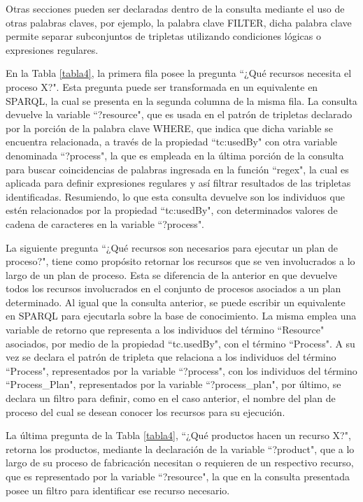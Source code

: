 \documentclass[journal]{IEEEtran}
\begin{document}
Otras secciones pueden ser declaradas dentro de la consulta mediante el uso de otras palabras claves, por ejemplo, la palabra clave FILTER, dicha palabra clave permite separar subconjuntos de tripletas utilizando condiciones l\'ogicas o expresiones regulares. 

En la Tabla \ref{tabla4}, la primera fila posee la pregunta ``¿Qu\'e recursos necesita el proceso X?". Esta pregunta puede ser transformada en un equivalente en SPARQL, la cual se presenta en la segunda columna de la misma fila. La consulta devuelve la variable ``?resource", que es usada en el patr\'on de tripletas declarado por la porci\'on de la palabra clave WHERE, que indica que dicha variable se encuentra relacionada, a trav\'es de la propiedad ``tc:usedBy" con otra variable denominada ``?process", la que es empleada en la \'ultima porci\'on de la consulta para buscar coincidencias de palabras ingresada en la funci\'on ``regex", la cual es aplicada para definir expresiones regulares y as\'i filtrar resultados de las tripletas identificadas. Resumiendo, lo que esta consulta devuelve son los individuos que est\'en relacionados por la propiedad ``tc:usedBy", con determinados valores de cadena de caracteres en la variable ``?process".

La siguiente pregunta ``¿Qu\'e recursos son necesarios para ejecutar un plan de proceso?", tiene como prop\'osito retornar los recursos que se ven involucrados a lo largo de un plan de proceso. Esta se diferencia de la anterior en que devuelve todos los recursos involucrados en el conjunto de procesos asociados a un plan determinado. Al igual que la consulta anterior, se puede escribir un equivalente en SPARQL para ejecutarla sobre la base de conocimiento. La misma emplea una variable de retorno que representa a los individuos del t\'ermino ``Resource" asociados, por medio de la propiedad ``tc.usedBy", con el t\'ermino ``Process". A su vez se declara el patr\'on de tripleta que relaciona a los individuos del t\'ermino ``Process", representados por la variable ``?process", con los individuos del t\'ermino ``Process\_Plan", representados por la variable ``?process\_plan", por \'ultimo, se declara un filtro para definir, como en el caso anterior, el nombre del plan de proceso del cual se desean conocer los recursos para su ejecuci\'on.

La \'ultima pregunta de la Tabla \ref{tabla4}, ``¿Qu\'e productos hacen un recurso X?", retorna los productos, mediante la declaraci\'on de la variable ``?product", que a lo largo de su proceso de fabricaci\'on necesitan o requieren de un respectivo recurso, que es representado por la variable ``?resource", la que en la consulta presentada posee un filtro para identificar ese recurso necesario.
\end{document}
